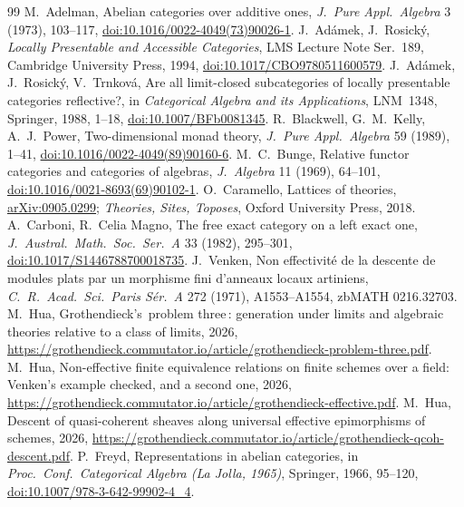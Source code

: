 \documentclass[11pt,a4paper]{amsart}
\theoremstyle{definition}
\theoremstyle{remark}
\newcommand{\q}[1]{\guillemotleft\,#1\,\guillemotright}
\begin{document}
\begin{thebibliography}{99}
 M.~Adelman, Abelian categories over additive ones, \emph{J.\ Pure Appl.\ Algebra} 3 (1973), 103--117, \href{https://doi.org/10.1016/0022-4049(73)90026-1}{doi:10.1016/0022-4049(73)90026-1}.
 J.~Adámek, J.~Rosický, \emph{Locally Presentable and Accessible Categories}, LMS Lecture Note Ser.~189, Cambridge University Press, 1994, \href{https://doi.org/10.1017/CBO9780511600579}{doi:10.1017/CBO9780511600579}.
 J.~Adámek, J.~Rosický, V.~Trnková, Are all limit-closed subcategories of locally presentable categories reflective?, in \emph{Categorical Algebra and its Applications}, LNM~1348, Springer, 1988, 1--18, \href{https://doi.org/10.1007/BFb0081345}{doi:10.1007/BFb0081345}.
 R.~Blackwell, G.~M.~Kelly, A.~J.~Power, Two-dimensional monad theory, \emph{J.\ Pure Appl.\ Algebra} 59 (1989), 1--41, \href{https://doi.org/10.1016/0022-4049(89)90160-6}{doi:10.1016/0022-4049(89)90160-6}.
 M.~C.~Bunge, Relative functor categories and categories of algebras, \emph{J.\ Algebra} 11 (1969), 64--101, \href{https://doi.org/10.1016/0021-8693(69)90102-1}{doi:10.1016/0021-8693(69)90102-1}.
 O.~Caramello, Lattices of theories, \href{https://arxiv.org/abs/0905.0299}{arXiv:0905.0299}; \emph{Theories, Sites, Toposes}, Oxford University Press, 2018.
 A.~Carboni, R.~Celia Magno, The free exact category on a left exact one, \emph{J.\ Austral.\ Math.\ Soc.\ Ser.~A} 33 (1982), 295--301, \href{https://doi.org/10.1017/S1446788700018735}{doi:10.1017/S1446788700018735}.
 J.~Venken, Non effectivité de la descente de modules plats par un morphisme fini d'anneaux locaux artiniens, \emph{C.\ R.\ Acad.\ Sci.\ Paris Sér.~A} 272 (1971), A1553--A1554, zbMATH 0216.32703.
 M.~Hua, Grothendieck's \q{problem three}: generation under limits and algebraic theories relative to a class of limits, 2026, \url{https://grothendieck.commutator.io/article/grothendieck-problem-three.pdf}.
 M.~Hua, Non-effective finite equivalence relations on finite schemes over a field: Venken's example checked, and a second one, 2026, \url{https://grothendieck.commutator.io/article/grothendieck-effective.pdf}.
 M.~Hua, Descent of quasi-coherent sheaves along universal effective epimorphisms of schemes, 2026, \url{https://grothendieck.commutator.io/article/grothendieck-qcoh-descent.pdf}.
 P.~Freyd, Representations in abelian categories, in \emph{Proc.\ Conf.\ Categorical Algebra (La Jolla, 1965)}, Springer, 1966, 95--120, \href{https://doi.org/10.1007/978-3-642-99902-4_4}{doi:10.1007/978-3-642-99902-4\_4}.

\end{thebibliography}
\end{document}
